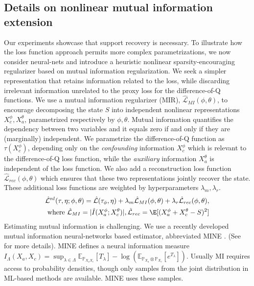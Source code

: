 \documentclass[opre,nonblindrev]{informs4}
\newcommand{\blipadv}{\tau}
\newcommand{\FGen}{T}
\newcommand{\PJ}[2]{\mathbb{P}_{#1#2}}
\newcommand{\PI}[2]{\mathbb{P}_{#1}\otimes\mathbb{P}_{#2}}
\newcommand{\EE}{\mathbb{E}}
\newcommand{\PP}{\mathbb{P}}
\begin{document}
\subsection{Details on nonlinear mutual information extension}\label{apx-experiments-mi}
Our experiments showcase that support recovery is necessary. To illustrate how the loss function approach permits more complex parametrizations, we now consider neural-nets and introduce a heuristic nonlinear sparsity-encouraging regularizer based on mutual information regularization. We seek a simpler representation that retains information related to the loss, while discarding irrelevant information unrelated to the proxy loss for the difference-of-Q functions. We use a mutual information regularizer (MIR), $\hat{\mathcal{L}}_{MI} (\phi,\theta)$, to encourage decomposing the state $S$ into independent nonlinear representations $X_c^\phi, X_a^\theta$, parametrized respectively by $\phi,\theta.$ Mutual information quantifies the dependency between two variables and it equals zero if and only if they are (marginally) independent. We parametrize the difference-of-Q function as $\blipadv(X_c^\phi)$, depending only on the \textit{confounding} information $X_c^\phi$ which is relevant to the difference-of-Q loss function, while the \textit{auxiliary} information $X_a^\theta$ is independent of the loss function. We also add a reconstruction loss function $\hat{\mathcal{L}}_{rec}(\phi,\theta)$ which ensures that these two representations jointly recover the state. These additional loss functions are weighted by hyperparameters $\lambda_{m}, \lambda_{r}$.
\begin{align*}
     &\hat{\mathcal{L}}^{nl}(\tau, \eta;\phi,\theta)  = \hat{\mathcal{L}}(\tau_\phi, \eta) + \lambda_{m} \hat{\mathcal{L}}_{MI} (\phi,\theta)
 + \lambda_{r} \hat{\mathcal{L}}_{rec}(\phi,\theta),
 \\
 & 
 \text{ where }
  \hat{\mathcal{L}}_{MI} = |\hat{I}(X_a^{\phi};X_c^{\theta})|, \hat{\mathcal{L}}_{rec} = \E[(X_a^{\phi}+X_c^{\theta} - S)^2 ]
\end{align*}
Estimating mutual information is challenging. We use a recently developed mutual information neural-networks based estimator, abbreviated MINE \citep{belghazi2018mutual}. (See  for more details). MINE defines a neural information measure $I_{\Lambda}(X_a,X_c)  =  {\sup_{\lambda\in\Lambda} \EE_{\PJ{X_a}{X_c}}[\FGen_\lambda] - \log(\EE_{\PI{X_a}{X_c}}[e^{\FGen_\lambda}])}.$ Usually MI requires access to probability densities, though only samples from the joint distribution in ML-based methods are available. MINE uses these samples.
\end{document}
